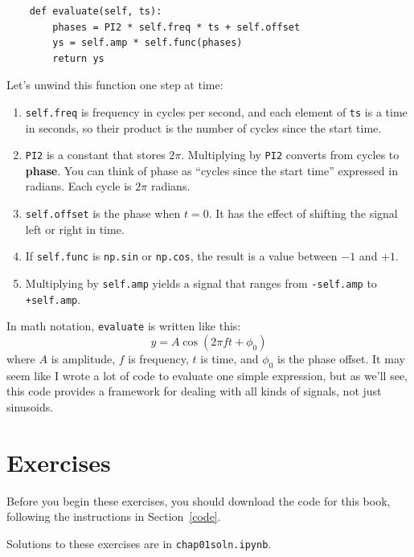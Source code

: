 \documentclass[12pt]{book}
\begin{document}
\begin{verbatim}
    def evaluate(self, ts):
        phases = PI2 * self.freq * ts + self.offset
        ys = self.amp * self.func(phases)
        return ys
\end{verbatim}

Let's unwind this function one step at time:

\begin{enumerate}

\item {\tt self.freq} is frequency in cycles per second, and each
  element of {\tt ts} is a time in seconds, so their product is the
  number of cycles since the start time.

\item {\tt PI2} is a constant that stores $2 \pi$.  Multiplying by
  {\tt PI2} converts from cycles to {\bf phase}.  You can think of
  phase as ``cycles since the start time'' expressed in radians.  Each
  cycle is $2 \pi$ radians.

\item {\tt self.offset} is the phase when $t=0$.
  It has the effect of shifting the signal left or right in time.

\item If {\tt self.func} is {\tt np.sin} or {\tt np.cos}, the result is a
  value between $-1$ and $+1$.

\item Multiplying by {\tt self.amp} yields a signal that ranges from
  {\tt -self.amp} to {\tt +self.amp}.

\end{enumerate}

In math notation, {\tt evaluate} is written like this:
%
\[ y = A \cos (2 \pi f t + \phi_0) \]
%
where $A$ is amplitude, $f$ is frequency, $t$ is time, and $\phi_0$
is the phase offset.  It may seem like I wrote a lot of code
to evaluate one simple expression, but as we'll see, this code
provides a framework for dealing with all kinds of signals, not
just sinusoids.


\section{Exercises}

Before you begin these exercises, you should download the code
for this book, following the instructions in Section~\ref{code}.

Solutions to these exercises are in {\tt chap01soln.ipynb}.
\end{document}
